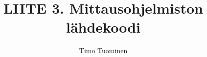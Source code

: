 \documentclass[a4paper,12pt]{article}
\title{LIITE 3. Mittausohjelmiston lähdekoodi}
\date{}
\author{Timo Tuominen}
\begin{document}
\maketitle{}

\renewcommand{\theFancyVerbLine}{
  \sffamily\textcolor[rgb]{0.5,0.5,0.5}{\scriptsize\arabic{FancyVerbLine}}}

\renewcommand*\contentsname{Tiedostot}
\tableofcontents
\end{document}
